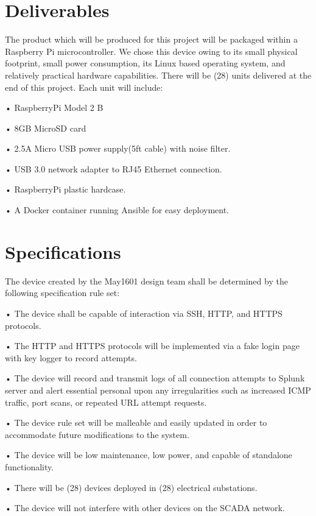 \section{Deliverables}

The product which will be produced for this project will be packaged within a Raspberry Pi microcontroller. We chose this device owing to its small physical footprint, small power consumption, its Linux based operating system, and relatively practical hardware capabilities. There will be (28) units delivered at the end of this project. Each unit will include:

• RaspberryPi Model 2 B

• 8GB MicroSD card

• 2.5A Micro USB power supply(5ft cable) with noise filter.

• USB 3.0 network adapter to RJ45 Ethernet connection.

• RaspberryPi plastic hardcase.

• A Docker container running Ansible for easy deployment.

\section{Specifications}

The device created by the May1601 design team shall be determined by the following specification rule set:

• The device shall be capable of interaction via SSH, HTTP, and HTTPS protocols.

• The HTTP and HTTPS protocols will be implemented via a fake login page with key logger to record attempts.

• The device will record and transmit logs of all connection attempts to Splunk server and alert essential personal upon any irregularities such as increased ICMP traffic, port scans, or repeated URL attempt requests. 

• The device rule set will be malleable and easily updated in order to accommodate future modifications to the system.

• The device will be low maintenance, low power, and capable of standalone functionality. 

• There will be (28) devices deployed in (28) electrical substations. 

• The device will not interfere with other devices on the SCADA network. 
